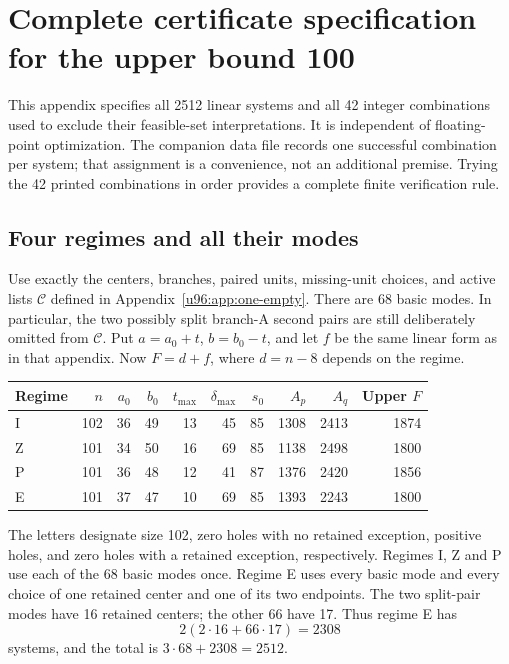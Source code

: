 \documentclass[11pt,a4paper]{article}
\theoremstyle{remark}
\begin{document}
\clearpage
\section[Certificate specification for upper bound 100]{Complete certificate specification for the upper bound 100}\label{u96:app:upper100}
This appendix specifies all 2512 linear systems and all 42 integer
combinations used to exclude their feasible-set interpretations. It is
independent of floating-point optimization. The companion data file records
one successful combination per system; that assignment is a convenience,
not an additional premise. Trying the 42 printed combinations in order
provides a complete finite verification rule.

\subsection{Four regimes and all their modes}
Use exactly the centers, branches, paired units, missing-unit choices, and
active lists $\mathcal C$ defined in Appendix~\ref{u96:app:one-empty}. There
are 68 basic modes. In particular, the two possibly split branch-A second
pairs are still deliberately omitted from $\mathcal C$.
Put $a=a_0+t$, $b=b_0-t$, and let $f$ be the same linear form as in that
appendix. Now $F=d+f$, where $d=n-8$ depends on the regime.
\begin{center}\small
\begin{tabular}{lrrrrrrrrr}
\toprule
Regime&$n$&$a_0$&$b_0$&$t_{\max}$&$\delta_{\max}$&$s_0$&$A_p$&$A_q$&Upper $F$\\
\midrule
I&102&36&49&13&45&85&1308&2413&1874\\
Z&101&34&50&16&69&85&1138&2498&1800\\
P&101&36&48&12&41&87&1376&2420&1856\\
E&101&37&47&10&69&85&1393&2243&1800\\
\bottomrule
\end{tabular}
\end{center}
The letters designate size 102, zero holes with no retained exception,
positive holes, and zero holes with a retained exception, respectively.
Regimes I, Z and P use each of the 68 basic modes once. Regime E uses
every basic mode and every choice of one retained center and one of its
two endpoints. The two split-pair modes have 16 retained centers; the
other 66 have 17. Thus regime E has
\[
 2(2\cdot16+66\cdot17)=2308
\]
systems, and the total is $3\cdot68+2308=2512$.
\end{document}
